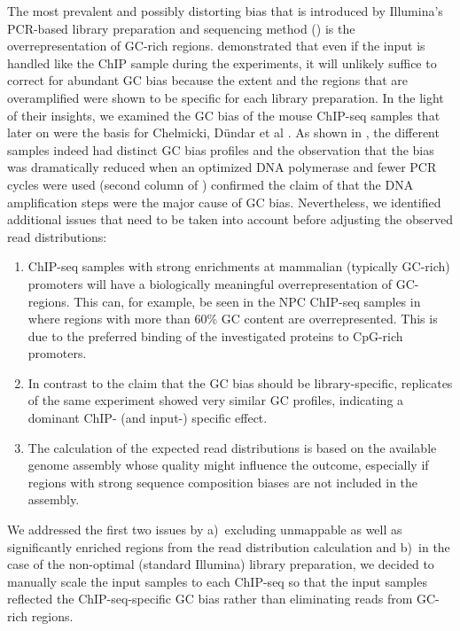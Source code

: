 The most prevalent and possibly distorting bias that is introduced by Illumina’s PCR-based library preparation and sequencing method () is the overrepresentation of GC-rich regions. \citet{Benjamini2012} demonstrated that even if the input is handled like the ChIP sample during the experiments, it will unlikely suffice to correct for abundant GC bias because the extent and the regions that are overamplified were shown to be specific for each library preparation. In the light of their insights, we examined the GC bias of the mouse ChIP-seq samples that later on were the basis for Chelmicki, Dündar et al \citep{Chelmicki2014}. As shown in , the different samples indeed had distinct GC bias profiles and the observation that the bias was dramatically reduced when an optimized DNA polymerase and fewer PCR cycles were used (second column of ) confirmed the claim of \citet{Benjamini2012} that the DNA amplification steps were the major cause of GC bias. Nevertheless, we identified additional issues that need to be taken into account before adjusting the observed read distributions: 
%
\begin{enumerate}[topsep=0pt]
\item ChIP-seq samples with strong enrichments at mammalian (typically GC-rich) promoters will have a biologically meaningful overrepresentation of GC-regions. This can, for example, be seen in the NPC ChIP-seq samples in  where regions with more than 60\% GC content are overrepresented. This is due to the preferred binding of the investigated proteins to CpG-rich promoters.
\item In contrast to the claim that the GC bias should be library-specific, replicates of the same experiment showed very similar GC profiles, indicating a dominant ChIP- (and input-) specific effect.
\item The calculation of the expected read distributions is based on the available genome assembly whose quality might influence the outcome, especially if regions with strong sequence composition biases are not included in the assembly.
\end{enumerate}
%
We addressed the first two issues by a)~excluding unmappable as well as significantly enriched regions from the read distribution calculation and b)~in the case of the non-optimal (standard Illumina) library preparation, we decided to manually scale the input samples to each ChIP-seq so that the input samples reflected the ChIP-seq-specific GC bias rather than eliminating reads from GC-rich regions.

